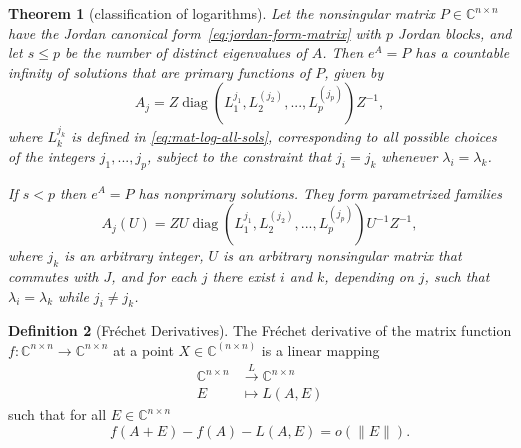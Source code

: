 \documentclass[letterpaper,10pt,journal,final]{IEEEtran}
\newtheorem{theorem}{Theorem}
\theoremstyle{definition}
\newtheorem{definition}[theorem]{Definition}
\theoremstyle{remark}
\newcommand{\diag}{\operatorname{diag}}
\begin{document}
\begin{theorem}[classification of logarithms{\protect\cite[Thm.~1.28]{Higham2008}}]
  \label{thm:matrix-logarithm-classification}
  Let the nonsingular matrix $P \in \mathbb{C}^{n \times n}$ have the Jordan canonical form~\eqref{eq:jordan-form-matrix} with $p$ Jordan blocks, and let $s \leq p$ be the number of distinct eigenvalues of $A$. Then $e^A = P$ has a countable infinity of solutions that are primary functions of $P$, given by
  \begin{equation}
    \label{eq:logm-classifiction-primary}
    A_j = Z \diag(L_1^{j_1}, L_2^{(j_2)}, ..., L_p^{(j_p)}) Z^{-1},
  \end{equation}
  where $L_k^{j_k}$ is defined in \eqref{eq:mat-log-all-sols}, corresponding to all possible choices of the integers $j_1, ..., j_p$, subject to the constraint that $j_i = j_k$ whenever $\lambda_i = \lambda_k$.

  If $s < p$ then $e^A = P$ has nonprimary solutions. They form parametrized families
  \begin{equation}
    \label{eq:logm-classification-nonprimary}
    A_j(U) = ZU \diag(L_1^{j_1}, L_2^{(j_2)}, ..., L_p^{(j_p)}) U^{-1}Z^{-1},
  \end{equation}
  where $j_k$ is an arbitrary integer, $U$ is an arbitrary nonsingular matrix that commutes with $J$, and for each $j$ there exist $i$ and $k$, depending on $j$, such that $\lambda_i = \lambda_k$ while $j_i \neq j_k$.
\end{theorem}



\begin{definition}[Fr\'{e}chet Derivatives\cite{Higham2008}]
  \label{def:Frechet-devrivative}
  The Fr\'{e}chet derivative of the matrix function \(f: \mathbb{C}^{n\times n} \rightarrow \mathbb{C}^{n \times n} \) at a point \(X\in \mathbb{C}^{(n \times n)}\) is a linear mapping
  \begin{align*}
    \mathbb{C}^{n \times n} &\overset{L}{\longrightarrow} \mathbb{C}^{n \times n}\\
    E &\longmapsto L(A, E)
  \end{align*}
such that for all $E \in \mathbb{C}^{n\times n}$
  \[ f(A+E) - f(A) - L(A, E) = o(\| E \|). \]
\end{definition}
\end{document}
